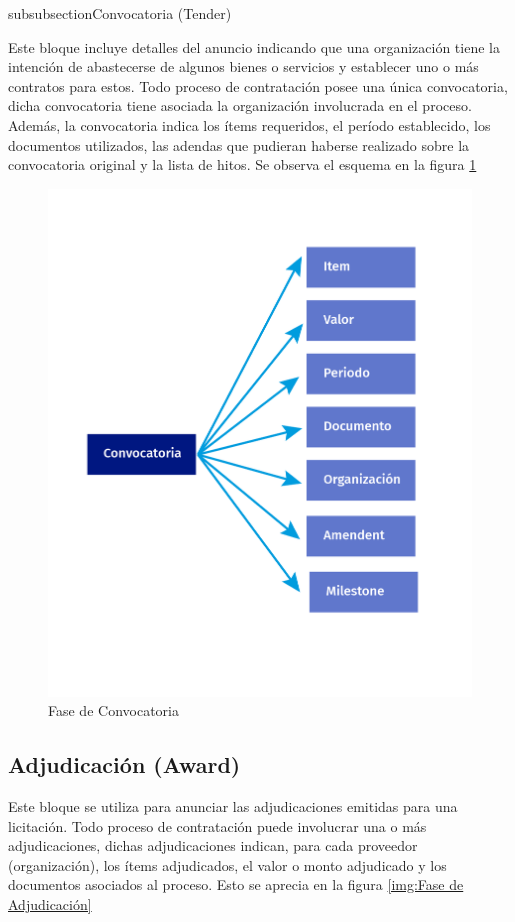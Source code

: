 subsubsection{Convocatoria (Tender)}

Este bloque incluye detalles del anuncio indicando que una organización tiene la intención de abastecerse de algunos bienes o servicios y establecer uno o más contratos para estos. Todo proceso de contratación posee una única convocatoria, dicha convocatoria tiene asociada la organización involucrada en el proceso. Además, la convocatoria indica los ítems requeridos, el período establecido, los documentos utilizados, las adendas que pudieran haberse realizado sobre la convocatoria original y la lista de hitos. Se observa el esquema en la figura \ref{img:Fase de Convocatoria}

\begin{figure}[h!]
    \centering
    \includegraphics[width=150mm]{figuras/Diagramas_Convocatoria.png}
    \caption{Fase de Convocatoria}
    \label{img:Fase de Convocatoria}
\end{figure}

\subsection{Adjudicación (Award)}
Este bloque se utiliza para anunciar las adjudicaciones emitidas para una licitación. Todo proceso de contratación puede involucrar una o más adjudicaciones, dichas adjudicaciones indican, para cada proveedor (organización), los ítems adjudicados, el valor o monto adjudicado y los documentos asociados al proceso. Esto se aprecia en la figura \ref{img:Fase de Adjudicación}



